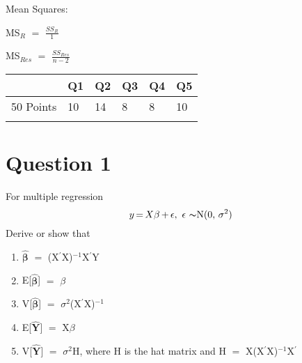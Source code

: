 \documentclass{article}
\newcommand{\mt}[1]{\ensuremath{#1}}
\newcommand\bsc[2][\DefaultOpt]{%
  \def\DefaultOpt{#2}%
  \section[#1]{#2}%
}
\newcommand{\balist}{\begin{enumerate}[label=\alph*.]}
\newcommand{\elist}{\end{enumerate}}
\newcommand{\ep}{\mt{\epsilon} }         %
\newcommand{\bta}{\mt{\beta} }
\newcommand{\ps}{\mt{\operatorname{+}} }
\newcommand{\eql}{ \mt{\operatorname{=}} }
\newcommand{\pr}{\mt{^\prime}} 		   %
\newcommand{\uw}[2]{#1\mt{_{#2}}}
\newcommand{\uf}[2]{#1\mt{^{#2}}}
\newcommand{\frc}[2]{\mt{\frac{#1}{#2}}}
\newcommand{\eqn}[1]{\[#1\]}
\newcommand{\txt}[1]{\text{#1}} %
\newcommand{\tl}{\mt{\thicksim}}
\newcommand{\ssq}{\mt{\sigma^2}}
\newcommand{\bh}[1]{\mathbf{\hat{\text{$#1$}}}}
\newcommand{\bth}{\mt{\bh{\beta}}}
\newcommand{\yh}{\mt{\bh{Y}}}
\newcommand{\exv}[1]{E[#1]}
\newcommand{\vrn}[1]{V[#1]}
\begin{document}
Mean Squares:

\uw{MS}{R} \eql \frc{\uw{SS}{R}}{1}

\uw{MS}{Res} \eql \frc{\uw{SS}{Res}}{n - 2}





\newpage

\begin{table}[ht]
\centering
\begin{tabular}{llllll}
  \hline
 & Q1 & Q2 & Q3 & Q4 & Q5 \\ 
  \hline
50 Points & 10 & 14 & 8 & 8 & 10 \\ 
   &  &  &  &  &  \\ 
   \hline
\end{tabular}
\end{table}







\bsc{Question 1}{

For multiple regression
\eqn{y \eql X\beta \ps \ep, \txt{ \ep\tl N(0, \ssq)}}
Derive or show that

\balist
\item \bth \eql \uf{(X\pr X)}{-1}X\pr Y
\item \exv{\bth} \eql \bta
\item \vrn{\bth} \eql \ssq\uf{(X\pr X)}{-1}
\item \exv{\yh} \eql X\bta
\item \vrn{\yh} \eql \ssq H, where H is the hat matrix and H \eql X\uf{(X\pr X)}{-1}X\pr
\elist

}
\end{document}
